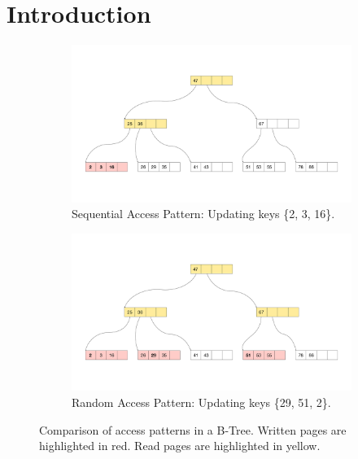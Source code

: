 
\chapter{Introduction}\label{chapter:introduction}

\begin{figure}[htpb]
  \centering
  \begin{subfigure}[t]{0.95\textwidth}
    \centering
    \includegraphics[width=\textwidth]{figures/sequential_access.pdf}
    \caption{Sequential Access Pattern: Updating keys \{2, 3, 16\}.}
    \label{fig:second-pdf}
  \end{subfigure}
  \hfill
  \begin{subfigure}[t]{0.95\textwidth}
    \centering
    \includegraphics[width=\textwidth]{figures/random_access.pdf}
    \caption{Random Access Pattern: Updating keys \{29, 51, 2\}.}
    \label{fig:first-pdf}
  \end{subfigure}
  \caption{Comparison of access patterns in a B-Tree. Written pages are highlighted in red. Read pages are highlighted in yellow.}
  \label{fig:access-pattern-comparison}
\end{figure}

